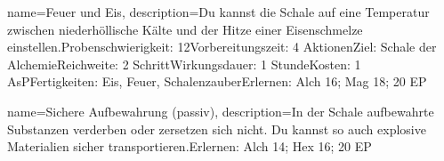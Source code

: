 {
    name={Feuer und Eis},
    description={Du kannst die Schale auf eine Temperatur zwischen niederhöllische Kälte und der Hitze einer Eisenschmelze einstellen.\newline Probenschwierigkeit: 12\newline Vorbereitungszeit: 4 Aktionen\newline Ziel: Schale der Alchemie\newline Reichweite: 2 Schritt\newline Wirkungsdauer: 1 Stunde\newline Kosten: 1 AsP\newline Fertigkeiten: Eis, Feuer, Schalenzauber\newline Erlernen: Alch 16; Mag 18; 20 EP}
}


{
    name={Sichere Aufbewahrung (passiv)},
    description={In der Schale aufbewahrte Substanzen verderben oder zersetzen sich nicht. Du kannst so auch explosive Materialien sicher transportieren.\newline Erlernen: Alch 14; Hex 16; 20 EP}
}


